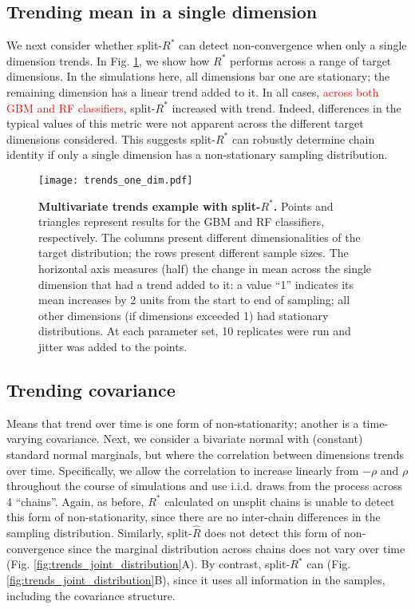 \documentclass{article}
\begin{document}
\subsection{Trending mean in a single dimension}\label{sec:non-stationary_single}
We next consider whether split-$R^*$ can detect non-convergence when only a single dimension trends. In Fig. \ref{fig:trends_one_dim}, we show how $R^*$ performs across a range of target dimensions. In the simulations here, all dimensions bar one are stationary; the remaining dimension has a linear trend added to it. In all cases, \textcolor{red}{across both GBM and RF classifiers}, split-$R^*$ increased with trend. Indeed, differences in the typical values of this metric were not apparent across the different target dimensions considered. This suggests split-$R^*$ can robustly determine chain identity if only a single dimension has a non-stationary sampling distribution.


\begin{figure}[!htb]
	\centerline{\texttt{[image: trends\_one\_dim.pdf]}}
	\caption{\textbf{Multivariate trends example with split-$R^*$.} Points and triangles represent results for the GBM and RF classifiers, respectively. The columns present different dimensionalities of the target distribution; the rows present different sample sizes. The horizontal axis measures (half) the change in mean across the single dimension that had a trend added to it: a value ``1'' indicates its mean increases by 2 units from the start to end of sampling; all other dimensions (if dimensions exceeded 1) had stationary distributions. At each parameter set, 10 replicates were run and jitter was added to the points.}
	\label{fig:trends_one_dim}
\end{figure}

\subsection{Trending covariance}\label{sec:non-stationary_covariance}
Means that trend over time is one form of non-stationarity; another is a time-varying covariance. Next, we consider a bivariate normal with (constant) standard normal marginals, but where the correlation between dimensions trends over time. Specifically, we allow the correlation to increase linearly from $-\rho$ and $\rho$ throughout the course of simulations and use i.i.d. draws from the process across 4 ``chains''. Again, as before, $R^*$ calculated on unsplit chains is unable to detect this form of non-stationarity, since there are no inter-chain differences in the sampling distribution. Similarly, split-$\widehat{R}$ does not detect this form of non-convergence since the marginal distribution across chains does not vary over time (Fig. \ref{fig:trends_joint_distribution}A). By contrast, split-$R^*$ can (Fig. \ref{fig:trends_joint_distribution}B), since it uses all information in the samples, including the covariance structure.
\end{document}
